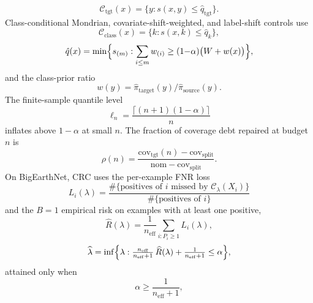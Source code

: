 \documentclass[journal]{IEEEtran}
\renewcommand{\_}{\textunderscore\allowbreak}
\begin{document}
\begin{equation}
\label{eq:target-cal}
\mathcal{C}_{\mathrm{tgt}}(x)
=\bigl\{y:s(x,y)\le\hat q_{\mathrm{tgt}}\bigr\}.
\end{equation}
Class-conditional Mondrian, covariate-shift-weighted, and label-shift controls use
\begin{equation}
\label{eq:class-mondrian}
\mathcal{C}_{\mathrm{class}}(x)=\bigl\{k:s(x,k)\le\hat q_k\bigr\},
\end{equation}
\begin{equation}
\label{eq:weighted-cp}
\hat q(x)
=\min\Bigl\{s_{(m)}:\sum_{i\le m}w_{(i)}\ge(1{-}\alpha)\bigl(W+w(x)\bigr)\Bigr\},
\end{equation}
and the class-prior ratio
\begin{equation}
\label{eq:labelshift-w}
w(y)=\hat\pi_{\mathrm{target}}(y)/\hat\pi_{\mathrm{source}}(y).
\end{equation}
The finite-sample quantile level
\begin{equation}
\label{eq:fs-quantile}
\ell_n=\frac{\lceil(n{+}1)(1{-}\alpha)\rceil}{n}
\end{equation}
inflates above $1{-}\alpha$ at small $n$. The fraction of coverage debt repaired at budget $n$ is
\begin{equation}
\label{eq:debt-repaired}
\rho(n)
=\frac{\mathrm{cov}_{\mathrm{tgt}}(n)-\mathrm{cov}_{\mathrm{split}}}{\mathrm{nom}-\mathrm{cov}_{\mathrm{split}}}.
\end{equation}
On BigEarthNet, CRC \citep{angelopoulos2024crc} uses the per-example FNR loss
\begin{equation}
\label{eq:fnr-loss}
L_i(\lambda)
=\frac{\#\{\text{positives of }i\text{ missed by }\mathcal{C}_\lambda(X_i)\}}
{\#\{\text{positives of }i\}}
\end{equation}
and the $B{=}1$ empirical risk on examples with at least one positive,
\begin{equation}
\label{eq:crc-risk}
\widehat{R}(\lambda)
=\frac{1}{n_{\mathrm{eff}}}\sum_{i:P_i\ge 1}L_i(\lambda),
\end{equation}
\begin{equation}
\label{eq:crc-lambda}
\widehat{\lambda}
=\inf\Bigl\{\lambda:
\tfrac{n_{\mathrm{eff}}}{n_{\mathrm{eff}}{+}1}\,\widehat{R}(\lambda)+\tfrac{1}{n_{\mathrm{eff}}{+}1}\le\alpha\Bigr\},
\end{equation}
attained only when
\begin{equation}
\label{eq:crc-attain}
\alpha\ge\frac{1}{n_{\mathrm{eff}}{+}1},
\end{equation}
\end{document}
